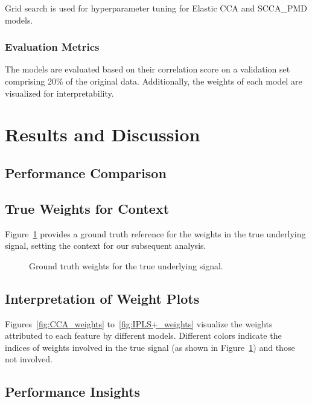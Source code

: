 Grid search is used for hyperparameter tuning for Elastic CCA and SCCA\_PMD models.

\subsubsection{Evaluation Metrics}

The models are evaluated based on their correlation score on a validation set comprising 20\% of the original data. Additionally, the weights of each model are visualized for interpretability.

\section{Results and Discussion}

\subsection{Performance Comparison}

\subsection{True Weights for Context}

Figure~\ref{fig:True_weights} provides a ground truth reference for the weights in the true underlying signal, setting the context for our subsequent analysis.

\begin{figure}[h]
    \centering
    
    \caption{Ground truth weights for the true underlying signal.}
    \label{fig:True_weights}
\end{figure}

\subsection{Interpretation of Weight Plots}

Figures~\ref{fig:CCA_weights} to~\ref{fig:IPLS+_weights} visualize the weights attributed to each feature by different models.
Different colors indicate the indices of weights involved in the true signal (as shown in Figure~\ref{fig:True_weights}) and those not involved.

\subsection{Performance Insights}

